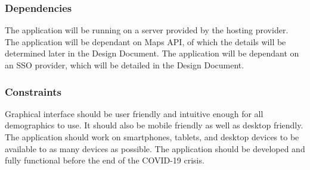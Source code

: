\subsubsection{Dependencies}

The application will be running on a server provided by the hosting provider.
The application will be dependant on Maps API, of which the details will be determined later in the Design Document.
The application will be dependant on an SSO provider, which will be detailed in the Design Document.

\subsubsection{Constraints}

Graphical interface should be user friendly and intuitive enough for all demographics to use.
It should also be mobile friendly as well as desktop friendly.
The application should work on smartphones, tablets, and desktop devices to be available to as many devices as possible.
The application should be developed and fully functional before the end of the COVID-19 crisis.

